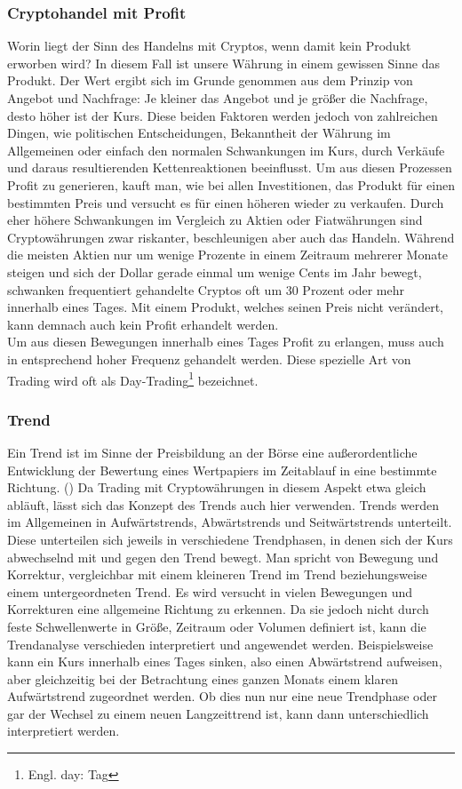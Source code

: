 \documentclass[12pt]{article}
\begin{document}
	\subsubsection{Cryptohandel mit Profit}
		Worin liegt der Sinn des Handelns mit Cryptos, wenn damit kein Produkt erworben wird? In diesem Fall ist unsere Währung in einem gewissen Sinne das Produkt. Der Wert ergibt sich im Grunde genommen aus dem Prinzip von Angebot und Nachfrage: Je kleiner das Angebot und je größer die Nachfrage, desto höher ist der Kurs. Diese beiden Faktoren werden jedoch von zahlreichen Dingen, wie politischen Entscheidungen, Bekanntheit der Währung im Allgemeinen oder einfach den normalen Schwankungen im Kurs, durch Verkäufe und daraus resultierenden Kettenreaktionen beeinflusst. Um aus diesen Prozessen Profit zu generieren, kauft man, wie bei allen Investitionen, das Produkt für einen bestimmten Preis und versucht es für einen höheren wieder zu verkaufen. Durch eher höhere Schwankungen im Vergleich zu Aktien oder Fiatwährungen sind Cryptowährungen zwar riskanter, beschleunigen aber auch das Handeln. Während die meisten Aktien nur um wenige Prozente in einem Zeitraum mehrerer Monate steigen und sich der Dollar gerade einmal um wenige Cents im Jahr bewegt, schwanken frequentiert gehandelte Cryptos oft um 30 Prozent oder mehr innerhalb eines Tages. Mit einem Produkt, welches seinen Preis nicht verändert, kann demnach auch kein Profit erhandelt werden.\\
		Um aus diesen Bewegungen innerhalb eines Tages Profit zu erlangen, muss auch in entsprechend hoher Frequenz gehandelt werden. Diese spezielle Art von Trading wird oft als Day-Trading\footnote{Engl. day: Tag} bezeichnet.
	\newpage	
	\subsubsection{Trend}
		\glqq Ein Trend ist im Sinne der Preisbildung an der Börse eine außerordentliche Entwicklung der Bewertung eines Wertpapiers im Zeitablauf in eine bestimmte Richtung\grqq{}. (\cite{WhatIsATrend}) Da Trading mit Cryptowährungen in diesem Aspekt etwa gleich abläuft, lässt sich das Konzept des Trends auch hier verwenden. Trends werden im Allgemeinen in Aufwärtstrends, Abwärtstrends und Seitwärtstrends unterteilt. Diese unterteilen sich jeweils in verschiedene Trendphasen, in denen sich der Kurs abwechselnd mit und gegen den Trend bewegt. Man spricht von Bewegung und Korrektur, vergleichbar mit einem kleineren Trend im Trend beziehungsweise einem untergeordneten Trend. Es wird versucht in vielen Bewegungen und Korrekturen eine allgemeine Richtung zu erkennen. Da sie jedoch nicht durch feste Schwellenwerte in Größe, Zeitraum oder Volumen definiert ist, kann die Trendanalyse verschieden interpretiert und angewendet werden. Beispielsweise kann ein Kurs innerhalb eines Tages sinken, also einen Abwärtstrend aufweisen, aber gleichzeitig bei der Betrachtung eines ganzen Monats einem klaren Aufwärtstrend zugeordnet werden. Ob dies nun nur eine neue Trendphase oder gar der Wechsel zu einem neuen Langzeittrend ist, kann dann unterschiedlich interpretiert werden.
\end{document}
